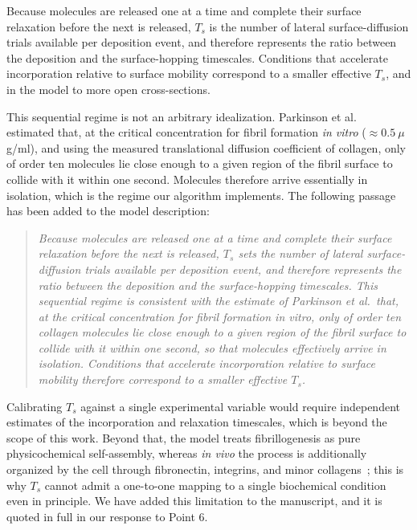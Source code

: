 \documentclass[11pt]{article}
\begin{document}
Because molecules are released one at a time and complete their surface
relaxation before the next is released, $T_s$ is the number of lateral
surface-diffusion trials available per deposition event, and therefore
represents the ratio between the deposition and the surface-hopping
timescales. Conditions that accelerate incorporation relative to surface
mobility correspond to a smaller effective $T_s$, and in the model to more open
cross-sections.

This sequential regime is not an arbitrary idealization. Parkinson et
al.~\cite{Parkinson1995} estimated that, at the critical concentration for
fibril formation \textit{in vitro} ($\approx 0.5~\mu$g/ml), and using the
measured translational diffusion coefficient of collagen, only of order ten
molecules lie close enough to a given region of the fibril surface to collide
with it within one second. Molecules therefore arrive essentially in isolation,
which is the regime our algorithm implements. The following passage has been
added to the model description:

\begin{quotation}\itshape
Because molecules are released one at a time and complete their surface
relaxation before the next is released, $T_s$ sets the number of lateral
surface-diffusion trials available per deposition event, and therefore
represents the ratio between the deposition and the surface-hopping
timescales. This sequential regime is consistent with the estimate of Parkinson
et al.\ that, at the critical concentration for fibril formation in vitro, only
of order ten collagen molecules lie close enough to a given region of the
fibril surface to collide with it within one second, so that molecules
effectively arrive in isolation. Conditions that accelerate incorporation
relative to surface mobility therefore correspond to a smaller effective $T_s$.
\end{quotation}

Calibrating $T_s$ against a single experimental variable would require
independent estimates of the incorporation and relaxation timescales, which is
beyond the scope of this work. Beyond that, the model treats fibrillogenesis as
pure physicochemical self-assembly, whereas \textit{in vivo} the process is
additionally organized by the cell through fibronectin, integrins, and minor
collagens~\cite{Kadler1996,Canty2005,Kadler2008}; this is why $T_s$ cannot admit
a one-to-one mapping to a single biochemical condition even in principle. We
have added this limitation to the manuscript, and it is quoted in full in our
response to Point 6.
\end{document}
